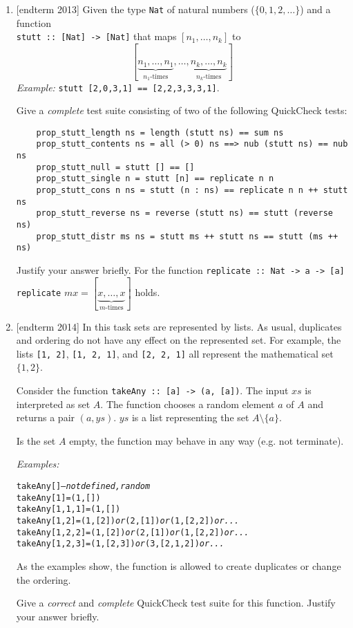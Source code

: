 \documentclass{article}
\def\code#1{\texttt{#1}}
\begin{document}
\begin{enumerate}
\item {[endterm 2013]} Given the type \verb|Nat| of natural numbers ($\{0,1,2,\dots\}$) and a function \\ \verb|stutt :: [Nat] -> [Nat]| that maps $[n_1, \dots, n_k]$ to
\[
[\underbrace{n_1, \dots, n_1}_{n_1\text{-times}}, \dots, \underbrace{n_k, \dots, n_k}_{n_k\text{-times}}]
\]
\textit{Example:} \verb|stutt [2,0,3,1] == [2,2,3,3,3,1]|. \par
Give a \textit{complete} test suite consisting of two of the following QuickCheck tests:
\begin{verbatim}
    prop_stutt_length ns = length (stutt ns) == sum ns
    prop_stutt_contents ns = all (> 0) ns ==> nub (stutt ns) == nub ns
    prop_stutt_null = stutt [] == []
    prop_stutt_single n = stutt [n] == replicate n n
    prop_stutt_cons n ns = stutt (n : ns) == replicate n n ++ stutt ns
    prop_stutt_reverse ns = reverse (stutt ns) == stutt (reverse ns)
    prop_stutt_distr ms ns = stutt ms ++ stutt ns == stutt (ms ++ ns)
\end{verbatim}
Justify your answer briefly. For the function \verb|replicate :: Nat -> a -> [a] replicate| $m x = [\underbrace{x, \dots, x}_{m\text{-times}}]$ holds.

\item {[endterm 2014]} In this task sets are represented by lists. As usual, duplicates and ordering do not have any effect on the represented set. For example, the lists \code{[1, 2]}, \code{[1, 2, 1]}, and \code{[2, 2, 1]} all represent the mathematical set $\{1, 2\}$. \par
Consider the function \code{takeAny :: [a] -> (a, [a])}. The input $xs$ is interpreted as set $A$. The function chooses a random element $a$ of $A$ and returns a pair $(a, ys)$. $ys$ is a list representing the set $A \setminus \{a\}$. \par
Is the set $A$ empty, the function may behave in any way (e.g. not terminate). \par
\textit{Examples:}
\begin{alltt}
    takeAny []                      \textit{-- not defined, random}
    takeAny [1] = (1 ,[])
    takeAny [1 ,1 ,1] = (1 ,[])
    takeAny [1 ,2] = (1 ,[2]) \textit{or} (2 ,[1]) \textit{or} (1 ,[2 ,2]) \textit{or ...}
    takeAny [1 ,2 ,2] = (1 ,[2]) \textit{or} (2 ,[1]) \textit{or} (1 ,[2 ,2]) \textit{or ...}
    takeAny [1 ,2 ,3] = (1 ,[2 ,3]) \textit{or} (3 ,[2 ,1 ,2]) \textit{or ...}
\end{alltt}
As the examples show, the function is allowed to create duplicates or change the ordering. \par
Give a \textit{correct} and \textit{complete} QuickCheck test suite for this function. Justify your answer briefly.


\end{enumerate}
\end{document}
